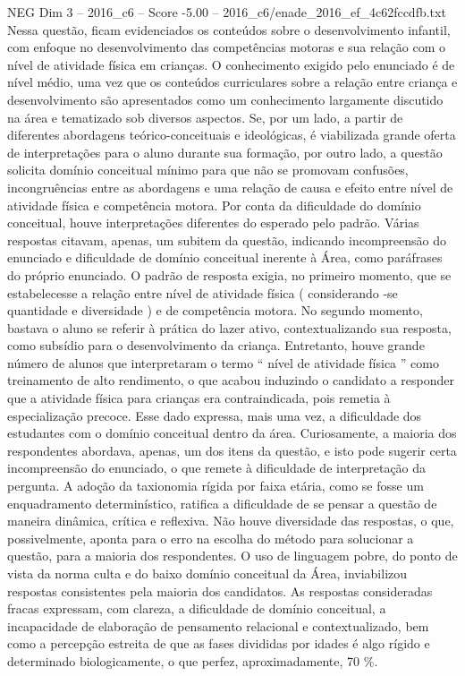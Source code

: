 \begin{textsample}{NEG Dim 3 – 2016\_c6 – Score -5.00 – 2016\_c6/enade\_2016\_ef\_4c62fccdfb.txt}
Nessa questão, ficam evidenciados os conteúdos sobre o desenvolvimento infantil, com enfoque no desenvolvimento das competências motoras e sua relação com o nível de atividade física em crianças.
O conhecimento exigido pelo enunciado é de nível médio, uma vez que os conteúdos curriculares sobre a relação entre criança e desenvolvimento são apresentados como um conhecimento largamente discutido na área e tematizado sob diversos aspectos.
Se, por um lado, a partir de diferentes abordagens teórico-conceituais e ideológicas, é viabilizada grande oferta de interpretações para o aluno durante sua formação, por outro lado, a questão solicita domínio conceitual mínimo para que não se promovam confusões, incongruências entre as abordagens e uma relação de causa e efeito entre nível de atividade física e competência motora.
Por conta da dificuldade do domínio conceitual, houve interpretações diferentes do esperado pelo padrão.
Várias respostas citavam, apenas, um subitem da questão, indicando incompreensão do enunciado e dificuldade de domínio conceitual inerente à Área, como paráfrases do próprio enunciado.
O padrão de resposta exigia, no primeiro momento, que se estabelecesse a relação entre nível de atividade física ( considerando -se quantidade e diversidade ) e de competência motora.
No segundo momento, bastava o aluno se referir à prática do lazer ativo, contextualizando sua resposta, como subsídio para o desenvolvimento da criança.
Entretanto, houve grande número de alunos que interpretaram o termo “ nível de atividade física ” como treinamento de alto rendimento, o que acabou induzindo o candidato a responder que a atividade física para crianças era contraindicada, pois remetia à especialização precoce.
Esse dado expressa, mais uma vez, a dificuldade dos estudantes com o domínio conceitual dentro da área.
Curiosamente, a maioria dos respondentes abordava, apenas, um dos itens da questão, e isto pode sugerir certa incompreensão do enunciado, o que remete à dificuldade de interpretação da pergunta.
A adoção da taxionomia rígida por faixa etária, como se fosse um enquadramento determinístico, ratifica a dificuldade de se pensar a questão de maneira dinâmica, crítica e reflexiva.
Não houve diversidade das respostas, o que, possivelmente, aponta para o erro na escolha do método para solucionar a questão, para a maioria dos respondentes.
O uso de linguagem pobre, do ponto de vista da norma culta e do baixo domínio conceitual da Área, inviabilizou respostas consistentes pela maioria dos candidatos.
As respostas consideradas fracas expressam, com clareza, a dificuldade de domínio conceitual, a incapacidade de elaboração de pensamento relacional e contextualizado, bem como a percepção estreita de que as fases divididas por idades é algo rígido e determinado biologicamente, o que perfez, aproximadamente, 70 \%.

\end{textsample}
